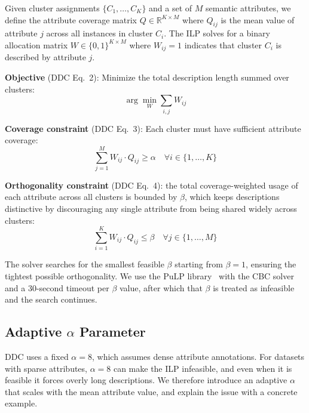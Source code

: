Given cluster assignments $\{C_1, \ldots, C_K\}$ and a set of $M$ semantic attributes, we define the attribute coverage matrix $Q \in \mathbb{R}^{K \times M}$ where $Q_{ij}$ is the mean value of attribute $j$ across all instances in cluster $C_i$. The ILP solves for a binary allocation matrix $W \in \{0,1\}^{K \times M}$ where $W_{ij} = 1$ indicates that cluster $C_i$ is described by attribute $j$.

\textbf{Objective} (DDC Eq.\ 2): Minimize the total description length summed over clusters:
\begin{equation}
    \arg\min_W \sum_{i,j} W_{ij}
    \label{eq:ilp_obj}
\end{equation}

\textbf{Coverage constraint} (DDC Eq.\ 3): Each cluster must have sufficient attribute coverage:
\begin{equation}
    \sum_{j=1}^{M} W_{ij} \cdot Q_{ij} \geq \alpha \quad \forall i \in \{1, \ldots, K\}
    \label{eq:ilp_coverage}
\end{equation}

\textbf{Orthogonality constraint} (DDC Eq.\ 4): the total coverage-weighted usage of each attribute across all clusters is bounded by $\beta$, which keeps descriptions distinctive by discouraging any single attribute from being shared widely across clusters:
\begin{equation}
    \sum_{i=1}^{K} W_{ij} \cdot Q_{ij} \leq \beta \quad \forall j \in \{1, \ldots, M\}
    \label{eq:ilp_orthogonal}
\end{equation}

The solver searches for the smallest feasible $\beta$ starting from $\beta = 1$, ensuring the tightest possible orthogonality. We use the PuLP library~\citep{Mitchell2011} with the CBC solver and a 30-second timeout per $\beta$ value, after which that $\beta$ is treated as infeasible and the search continues.

\subsection{Adaptive \texorpdfstring{$\alpha$}{alpha} Parameter}
\label{sec:adaptive_alpha}

DDC uses a fixed $\alpha = 8$, which assumes dense attribute annotations. For datasets with sparse attributes, $\alpha = 8$ can make the ILP infeasible, and even when it is feasible it forces overly long descriptions. We therefore introduce an adaptive $\alpha$ that scales with the mean attribute value, and explain the issue with a concrete example.

